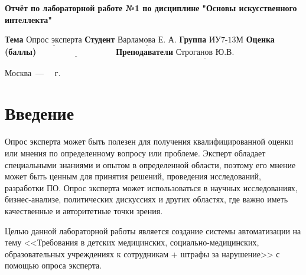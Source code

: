 \documentclass[12pt]{report}
\begin{document}
\begin{titlepage}
	
	\begin{center}
		\noindent\begin{minipage}{1.3\textwidth}\centering
			\Large\textbf{  Отчёт по лабораторной работе №1 по дисциплине}\newline
			\textbf{ "Основы искусственного интеллекта"}\newline\newline
		\end{minipage}
	\end{center}
	
	\noindent\textbf{Тема} $\underline{\text{Опрос эксперта}}$\newline\newline
	\noindent\textbf{Студент} $\underline{\text{Варламова Е. А.}}$\newline\newline
	\noindent\textbf{Группа} $\underline{\text{ИУ7-13М}}$\newline\newline
	\noindent\textbf{Оценка (баллы)} $\underline{\text{~~~~~~~~~~~~~~~~~~~~~~~~~~~}}$\newline\newline
	\noindent\textbf{Преподаватели} $\underline{\text{Строганов Ю.В.}}$\newline\newline\newline
	
	\begin{center}
		\vfill
		Москва~---~\the\year
		~г.
	\end{center}
\end{titlepage}
\large
\setcounter{page}{2}
\def\contentsname{СОДЕРЖАНИЕ}
\renewcommand{\contentsname}{СОДЕРЖАНИЕ}
\tableofcontents
\renewcommand\labelitemi{---}
\newpage
\chapter*{Введение}

Опрос эксперта может быть полезен для получения квалифицированной оценки или мнения по определенному вопросу или проблеме. 
Эксперт обладает специальными знаниями и опытом в определенной области, поэтому его мнение может быть ценным для принятия решений, проведения исследований, разработки ПО. 
Опрос эксперта может использоваться в научных исследованиях, бизнес-анализе, политических дискуссиях и других областях, где важно иметь качественные и авторитетные точки зрения.

Целью данной лабораторной работы является создание системы автоматизации на тему <<Требования в детских медицинских, социально-медицинских, образовательных учреждениях к сотрудникам + штрафы за нарушение>> с помощью опроса эксперта.
\end{document}

